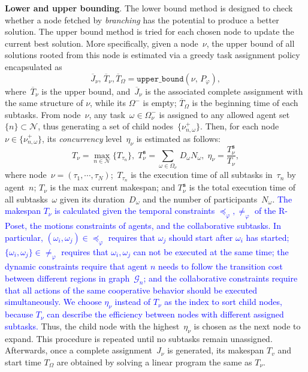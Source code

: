 \textbf{Lower and upper bounding}.
The lower bound method is designed to check whether a node fetched by \emph{branching}
has the potential to produce a better solution.
The upper bound method is tried for each chosen node to update
 the current best solution.
More specifically, given a node~$\nu$,
the upper bound of all solutions rooted from this node
is estimated via a greedy task assignment policy encapsulated as
\begin{equation}\label{eq:upper-bound}
\overline{J}_\nu,\, \overline{T}_\nu ,\overline{T}_\Omega= \texttt{upper\_bound}(\nu,\, P_{\varphi}),
\end{equation}
{where~$\overline{T}_\nu$ is the upper bound, and~$\overline{J}_\nu$ is the
associated complete assignment with the same structure of $\nu$, while its $\Omega^-$ is empty; $\overline{T}_\Omega$ is the beginning time
of each subtasks.}
From node~$\nu$, any task~$\omega\in \Omega^-_\nu$ is assigned
to any allowed agent set~$\{n\}\subset\mathcal{N}$,
thus generating a set of child nodes~$\{\nu^+_{n,\omega}\}$.
Then, for each node~$\nu\in \{\nu^+_{n,\omega}\}$,
its \emph{concurrency} level~$\eta_{\nu}$ is estimated as follows:
\begin{equation}\label{eq:node-makespan}
T_\nu = \max_{n\in\mathcal{N}} \{T_{\tau_n}\},\;
T^{\texttt{s}}_\nu = \sum_{\omega\in\Omega_\nu}\, D_{\omega}N_\omega,\;
\eta_\nu = \frac{T^{\texttt{s}}_\nu}{T_\nu},
\end{equation}
where node~$\nu=(\tau_1,\cdots,\tau_N)$;~$T_{\tau_n}$ is the execution
time of all subtasks in~$\tau_n$ by agent~$n$;
$T_\nu$ is the max current makespan; 
and $T^{\texttt{s}}_\nu$ is the total execution time of all subtasks~$\omega$
given its duration~$D_\omega$ and the number of participants~$N_\omega$.
\textcolor{blue}{The makespan $T_\nu$ is calculated given
  the temporal constraints $\preceq_{\varphi},\neq_{\varphi}$ of the R-Poset,
  the motions constraints of agents, and the collaborative subtasks.
  In particular, $(\omega_i,\omega_j)\in\preceq_\varphi$ requires that $\omega_j$ should start 
after $\omega_i$ has started; $\{\omega_i,\omega_j\}\in\neq_\varphi$
requires that $\omega_i, \omega_j$ can not be executed at the same time;
the dynamic constraints require that agent $n$ needs to follow the transition
cost between different regions in graph~$\mathcal{G}_n$; 
and the collaborative constraints require that all actions of 
the same cooperative behavior should be executed simultaneously. We choose $\eta_\nu$ instead of $T_\nu$ as the index to 
sort child nodes, because $T_\nu$ can describe the efficiency between
nodes with different assigned subtasks.}
Thus, the child node with the highest~$\eta_{\nu}$ is chosen as
the next node to expand.
This procedure is repeated until no subtasks remain unassigned.
Afterwards, once a complete assignment~$J_\nu$ is generated, 
its makespan $T_v$ and start time $T_\Omega$ are obtained by
solving a linear program the same as $T_\nu$.

